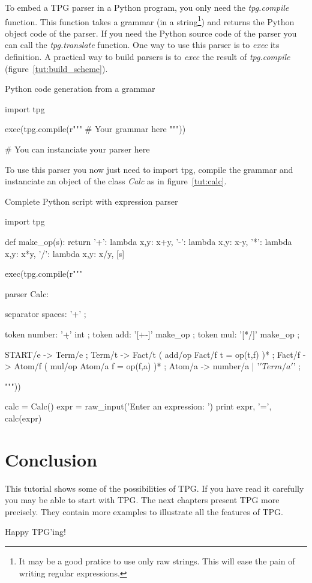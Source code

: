 To embed a TPG parser in a Python program, you only need the \emph{tpg.compile} function.
This function takes a grammar (in a string\footnote{It may be a good pratice to use only raw strings. This will ease the pain of writing regular expressions.}) and returns the Python object code of the parser.
If you need the Python source code of the parser you can call the \emph{tpg.translate} function.
One way to use this parser is to \emph{exec} its definition.
A practical way to build parsers is to \emph{exec} the result of \emph{tpg.compile} (figure~\ref{tut:build_scheme}).

\begin{code}
\caption{Python code generation from a grammar}				\label{tut:build_scheme}
\begin{verbatimtab}[4]
import tpg

exec(tpg.compile(r""" # Your grammar here """))

# You can instanciate your parser here
\end{verbatimtab}
\end{code}

To use this parser you now just need to import tpg, compile the grammar and instanciate an object of the class \emph{Calc} as in figure~\ref{tut:calc}.

\begin{code}
\caption{Complete Python script with expression parser}		\label{tut:calc}
\begin{verbatimtab}[4]
import tpg

def make_op(s):
	return {
		'+': lambda x,y: x+y,
		'-': lambda x,y: x-y,
		'*': lambda x,y: x*y,
		'/': lambda x,y: x/y,
	}[s]

exec(tpg.compile(r"""

parser Calc:

	separator spaces: '\s+' ;

	token number: '\d+' int ;
	token add: '[+-]' make_op ;
	token mul: '[*/]' make_op ;

	START/e -> Term/e ;
	Term/t -> Fact/t ( add/op Fact/f {{ t = op(t,f) }} )* ;
	Fact/f -> Atom/f ( mul/op Atom/a {{ f = op(f,a) }} )* ;
	Atom/a -> number/a | '\(' Term/a '\)' ;

"""))

calc = Calc()
expr = raw_input('Enter an expression: ')
print expr, '=', calc(expr)
\end{verbatimtab}
\end{code}

\clearpage

\section{Conclusion}

This tutorial shows some of the possibilities of TPG.
If you have read it carefully you may be able to start with TPG.
The next chapters present TPG more precisely.
They contain more examples to illustrate all the features of TPG.

Happy TPG'ing!
